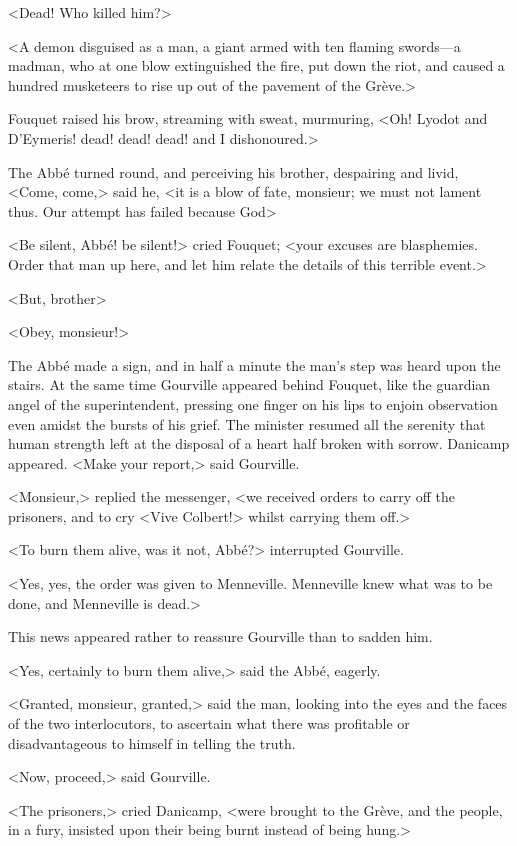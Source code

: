 <Dead! Who killed him?>

<A demon disguised as a man, a giant armed with ten flaming swords—a madman, who at one blow extinguished the fire, put down the riot, and caused a hundred musketeers to rise up out of the pavement of the Grève.>

Fouquet raised his brow, streaming with sweat, murmuring, <Oh! Lyodot and D'Eymeris! dead! dead! dead! and I dishonoured.>

The Abbé turned round, and perceiving his brother, despairing and livid, <Come, come,> said he, <it is a blow of fate, monsieur; we must not lament thus. Our attempt has failed because God\longdash>

<Be silent, Abbé! be silent!> cried Fouquet; <your excuses are blasphemies. Order that man up here, and let him relate the details of this terrible event.>

<But, brother\longdash>

<Obey, monsieur!>

The Abbé made a sign, and in half a minute the man's step was heard upon the stairs. At the same time Gourville appeared behind Fouquet, like the guardian angel of the superintendent, pressing one finger on his lips to enjoin observation even amidst the bursts of his grief. The minister resumed all the serenity that human strength left at the disposal of a heart half broken with sorrow. Danicamp appeared. <Make your report,> said Gourville.

<Monsieur,> replied the messenger, <we received orders to carry off the prisoners, and to cry <Vive Colbert!> whilst carrying them off.>

<To burn them alive, was it not, Abbé?> interrupted Gourville.

<Yes, yes, the order was given to Menneville. Menneville knew what was to be done, and Menneville is dead.>

This news appeared rather to reassure Gourville than to sadden him.

<Yes, certainly to burn them alive,> said the Abbé, eagerly.

<Granted, monsieur, granted,> said the man, looking into the eyes and the faces of the two interlocutors, to ascertain what there was profitable or disadvantageous to himself in telling the truth.

<Now, proceed,> said Gourville.

<The prisoners,> cried Danicamp, <were brought to the Grève, and the people, in a fury, insisted upon their being burnt instead of being hung.>

